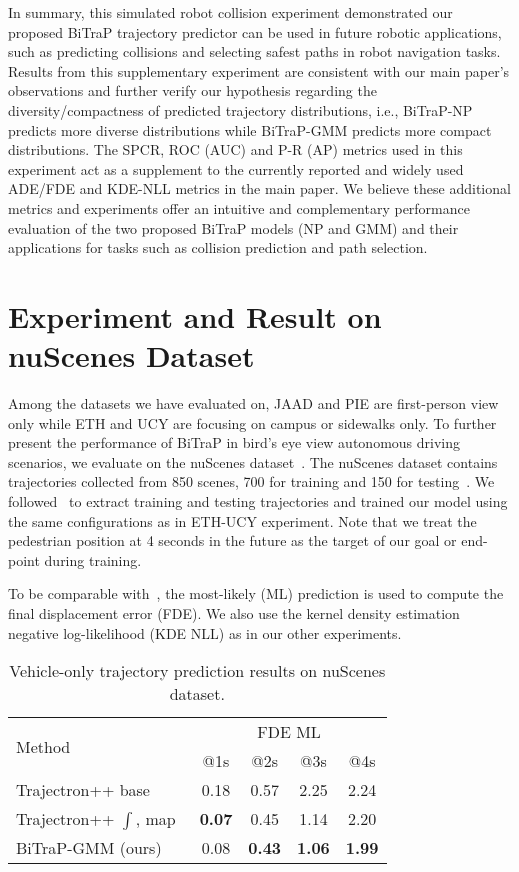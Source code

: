 \documentclass[letterpaper, 10 pt, conference]{ieeeconf}
\begin{document}
In summary, this simulated robot collision experiment demonstrated our proposed BiTraP trajectory predictor can be used in future robotic applications, such as predicting collisions and selecting safest paths in robot navigation tasks. Results from this supplementary experiment are consistent with our main paper's observations and further verify our hypothesis regarding the diversity/compactness of predicted trajectory distributions, i.e., BiTraP-NP predicts more diverse distributions while BiTraP-GMM predicts more compact distributions. The SPCR, ROC (AUC) and P-R (AP) metrics used in this experiment act as a supplement to the currently reported and widely used ADE/FDE and KDE-NLL metrics in the main paper. We believe these additional metrics and experiments offer an intuitive and complementary performance evaluation of the two proposed BiTraP models (NP and GMM) and their applications for tasks such as collision prediction and path selection. 

\section{Experiment and Result on nuScenes Dataset}
Among the datasets we have evaluated on, JAAD and PIE are first-person view only while ETH and UCY are focusing on campus or sidewalks only. To further present the performance of BiTraP in bird's eye view autonomous driving scenarios, we evaluate on the nuScenes dataset~\cite{nuscenes2019}. The nuScenes dataset contains trajectories collected from 850 scenes, 700 for training and 150 for testing~\cite{nuscenes2019}. We followed~\cite{salzmann2020trajectron++} to extract training and testing trajectories and trained our model using the same configurations as in ETH-UCY experiment. Note that we treat the pedestrian position at 4 seconds in the future as the target of our goal or end-point during training. 

 To be comparable with~\cite{salzmann2020trajectron++}, the most-likely (ML) prediction is used to compute the final displacement error (FDE). We also use the kernel density estimation negative log-likelihood (KDE NLL) as in our other experiments.


\begin{table}[htbp]
    \centering
    \begin{tabular}{l|cccc}
        \toprule
        \multirow{2}{*}{Method} & \multicolumn{4}{c}{FDE ML} \\
        \cmidrule{2-5} 
         & @1s & @2s & @3s & @4s \\
        \midrule
        Trajectron++ base~\cite{salzmann2020trajectron++} & 0.18 & 0.57 & 2.25 & 2.24 \\
        Trajectron++ $\int$, map~\cite{salzmann2020trajectron++} & \textbf{0.07} & 0.45 & 1.14 & 2.20 \\
        BiTraP-GMM (ours) & 0.08 & \textbf{0.43} & \textbf{1.06} & \textbf{1.99} \\
        \bottomrule
    \end{tabular}
    \caption{Vehicle-only trajectory prediction results on nuScenes dataset.}
    \label{tab:nuscenes_veh}
\end{table}
\end{document}
